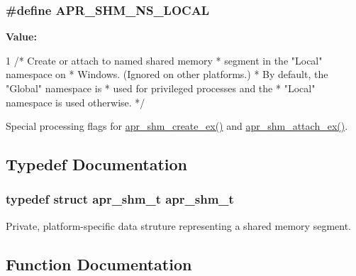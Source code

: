 \subsubsection[{\texorpdfstring{A\+P\+R\+\_\+\+S\+H\+M\+\_\+\+N\+S\+\_\+\+L\+O\+C\+AL}{APR_SHM_NS_LOCAL}}]{\setlength{\rightskip}{0pt plus 5cm}\#define A\+P\+R\+\_\+\+S\+H\+M\+\_\+\+N\+S\+\_\+\+L\+O\+C\+AL}\hypertarget{group__apr__shm_ga47cc28ddc5f32cf904383b9e4f82825b}{}\label{group__apr__shm_ga47cc28ddc5f32cf904383b9e4f82825b}
{\bfseries Value\+:}
\begin{DoxyCode}
1 \textcolor{comment}{/* Create or attach to named shared memory}
\textcolor{comment}{                               * segment in the "Local" namespace on}
\textcolor{comment}{                               * Windows.  (Ignored on other platforms.)}
\textcolor{comment}{                               * By default, the "Global" namespace is}
\textcolor{comment}{                               * used for privileged processes and the}
\textcolor{comment}{                               * "Local" namespace is used otherwise.}
\textcolor{comment}{                               */}
\end{DoxyCode}
Special processing flags for \hyperlink{group__apr__shm_ga21baaa66956641e06e072501f61882e7}{apr\+\_\+shm\+\_\+create\+\_\+ex()} and \hyperlink{group__apr__shm_ga088260723c96815610ff628f358d3630}{apr\+\_\+shm\+\_\+attach\+\_\+ex()}. 

\subsection{Typedef Documentation}
\subsubsection[{\texorpdfstring{apr\+\_\+shm\+\_\+t}{apr_shm_t}}]{\setlength{\rightskip}{0pt plus 5cm}typedef struct {\bf apr\+\_\+shm\+\_\+t} {\bf apr\+\_\+shm\+\_\+t}}\hypertarget{group__apr__shm_ga79e8c16bdeaf7ade4ef0f935249e7c2f}{}\label{group__apr__shm_ga79e8c16bdeaf7ade4ef0f935249e7c2f}
Private, platform-\/specific data struture representing a shared memory segment. 

\subsection{Function Documentation}
